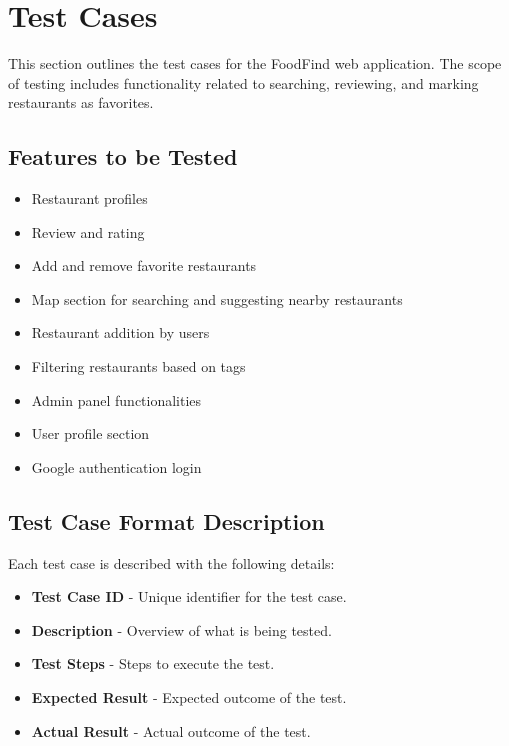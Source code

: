 \documentclass[12pt, a4paper, oneside]{article}
\begin{document}


\section{Test Cases}
This section outlines the test cases for the FoodFind web application. The scope of testing includes functionality related to searching, reviewing, and marking restaurants as favorites.

\subsection{Features to be Tested}
\begin{itemize}
	\item Restaurant profiles
	\item Review and rating
	\item Add and remove favorite restaurants
	\item Map section for searching and suggesting nearby restaurants
	\item Restaurant addition by users
	\item Filtering restaurants based on tags
	\item Admin panel functionalities
	\item User profile section
	\item Google authentication login
\end{itemize}

\subsection{Test Case Format Description}
Each test case is described with the following details:
\begin{itemize}
	\item \textbf{Test Case ID} - Unique identifier for the test case.
	\item \textbf{Description} - Overview of what is being tested.
	\item \textbf{Test Steps} - Steps to execute the test.
	\item \textbf{Expected Result} - Expected outcome of the test.
	\item \textbf{Actual Result} - Actual outcome of the test.
\end{itemize}
\end{document}
